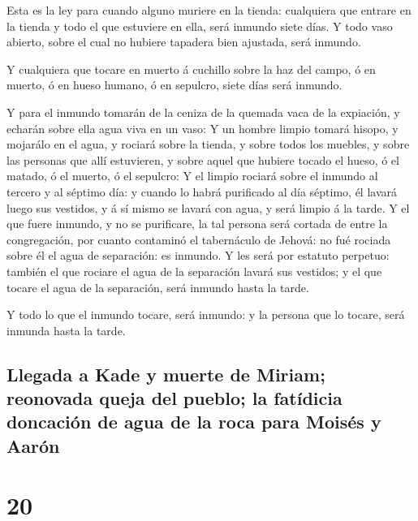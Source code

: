  Esta es la ley para cuando alguno muriere en la tienda:
cualquiera que entrare en la tienda y todo el que estuviere en ella,
será inmundo siete días.  Y todo vaso abierto, sobre el
cual no hubiere tapadera bien ajustada, será inmundo.

 Y cualquiera que tocare en muerto á cuchillo sobre la
haz del campo, ó en muerto, ó en hueso humano, ó en sepulcro, siete días
será inmundo.

 Y para el inmundo tomarán de la ceniza de la quemada
vaca de la expiación, y echarán sobre ella agua viva en un vaso:
 Y un hombre limpio tomará hisopo, y mojarálo en el agua,
y rociará sobre la tienda, y sobre todos los muebles, y sobre las
personas que allí estuvieren, y sobre aquel que hubiere tocado el hueso,
ó el matado, ó el muerto, ó el sepulcro:  Y el limpio
rociará sobre el inmundo al tercero y al séptimo día: y cuando lo habrá
purificado al día séptimo, él lavará luego sus vestidos, y á sí mismo se
lavará con agua, y será limpio á la tarde.  Y el que
fuere inmundo, y no se purificare, la tal persona será cortada de entre
la congregación, por cuanto contaminó el tabernáculo de Jehová: no fué
rociada sobre él el agua de separación: es inmundo.  Y
les será por estatuto perpetuo: también el que rociare el agua de la
separación lavará sus vestidos; y el que tocare el agua de la
separación, será inmundo hasta la tarde.

 Y todo lo que el inmundo tocare, será inmundo: y la
persona que lo tocare, será inmunda hasta la tarde.

\hypertarget{llegada-a-kade-y-muerte-de-miriam-reonovada-queja-del-pueblo-la-fatuxeddicia-doncaciuxf3n-de-agua-de-la-roca-para-moisuxe9s-y-aaruxf3n}{%
\subsection{Llegada a Kade y muerte de Miriam; reonovada queja del
pueblo; la fatídicia doncación de agua de la roca para Moisés y
Aarón}\label{llegada-a-kade-y-muerte-de-miriam-reonovada-queja-del-pueblo-la-fatuxeddicia-doncaciuxf3n-de-agua-de-la-roca-para-moisuxe9s-y-aaruxf3n}}

\hypertarget{section-04-20}{%
\section{20}\label{section-04-20}}

